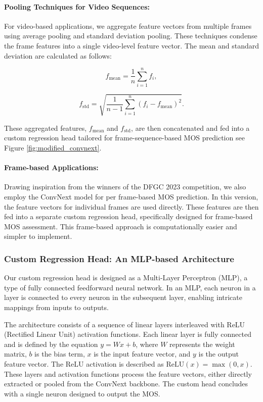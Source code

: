 \documentclass[a4paper,12pt,openright]{book}
\begin{document}
\paragraph{Pooling Techniques for Video Sequences:}
For video-based applications, we aggregate feature vectors from multiple frames using average pooling and standard deviation pooling. These techniques condense the frame features into a single video-level feature vector. The mean and standard deviation are calculated as follows:

\begin{equation}
f_{\mathrm{mean}} = \frac{1}{n}\sum_{i=1}^{n} f_{i},
\end{equation}

\begin{equation}
f_{\mathrm{std}} = \sqrt{\frac{1}{n - 1}\sum_{i=1}^{n}(f_{i} - f_{\mathrm{mean}})^2}.
\end{equation}

These aggregated features, \(f_{\mathrm{mean}}\) and \(f_{\mathrm{std}}\), are then concatenated and fed into a custom regression head tailored for frame-sequence-based MOS prediction see Figure \ref{fig:modified_convnext}.

\paragraph{Frame-based Applications:}
Drawing inspiration from the winners of the DFGC 2023 competition\cite{peng_etal_2023}, we also employ the ConvNext model for per frame-based MOS prediction. In this version, the feature vectors for individual frames are used directly. These features are then fed into a separate custom regression head, specifically designed for frame-based MOS assessment. This frame-based approach is computationally easier and simpler to implement.

\subsubsection{Custom Regression Head: An MLP-based Architecture}

Our custom regression head is designed as a Multi-Layer Perceptron (MLP), a type of fully connected feedforward neural network. In an MLP, each neuron in a layer is connected to every neuron in the subsequent layer, enabling intricate mappings from inputs to outputs.

The architecture consists of a sequence of linear layers interleaved with ReLU (Rectified Linear Unit) activation functions. Each linear layer is fully connected and is defined by the equation \(y = Wx + b\), where \(W\) represents the weight matrix, \(b\) is the bias term, \(x\) is the input feature vector, and \(y\) is the output feature vector. The ReLU activation is described as \(\text{ReLU}(x) = \max(0, x)\).
These layers and activation functions process the feature vectors, either directly extracted or pooled from the ConvNext backbone. The custom head concludes with a single neuron designed to output the MOS.
\end{document}
